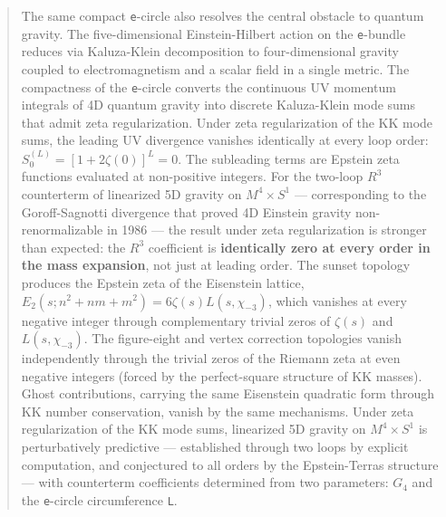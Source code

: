 \documentclass[aps,prd,preprint,superscriptaddress,longbibliography,floatfix]{revtex4-2}
\theoremstyle{remark}
\begin{document}
\begin{abstract}
The same compact \texttt{e}-circle also resolves the central obstacle to quantum gravity. The five-dimensional Einstein-Hilbert action on the \texttt{e}-bundle reduces via Kaluza-Klein decomposition to four-dimensional gravity coupled to electromagnetism and a scalar field in a single metric. The compactness of the \texttt{e}-circle converts the continuous UV momentum integrals of 4D quantum gravity into discrete Kaluza-Klein mode sums that admit zeta regularization. Under zeta regularization of the KK mode sums, the leading UV divergence vanishes identically at every loop order: $S_{0}^{(L)} = [1 + 2\zeta(0)]^L = 0$. The subleading terms are Epstein zeta functions evaluated at non-positive integers. For the two-loop $R^{3}$ counterterm of linearized 5D gravity on $M^{4} \times S^{1}$ --- corresponding to the Goroff-Sagnotti divergence that proved 4D Einstein gravity non-renormalizable in 1986 --- the result under zeta regularization is stronger than expected: the $R^{3}$ coefficient is \textbf{identically zero at every order in the mass expansion}, not just at leading order. The sunset topology produces the Epstein zeta of the Eisenstein lattice, $E_{2}(s; n^{2}+nm+m^{2}) = 6\zeta(s)L(s,\chi_{-3})$, which vanishes at every negative integer through complementary trivial zeros of $\zeta(s)$ and $L(s,\chi_{-3})$. The figure-eight and vertex correction topologies vanish independently through the trivial zeros of the Riemann zeta at even negative integers (forced by the perfect-square structure of KK masses). Ghost contributions, carrying the same Eisenstein quadratic form through KK number conservation, vanish by the same mechanisms. Under zeta regularization of the KK mode sums, linearized 5D gravity on $M^{4} \times S^{1}$ is perturbatively predictive --- established through two loops by explicit computation, and conjectured to all orders by the Epstein-Terras structure --- with counterterm coefficients determined from two parameters: $G_{4}$ and the \texttt{e}-circle circumference \texttt{L}.


\end{abstract}
\end{document}
